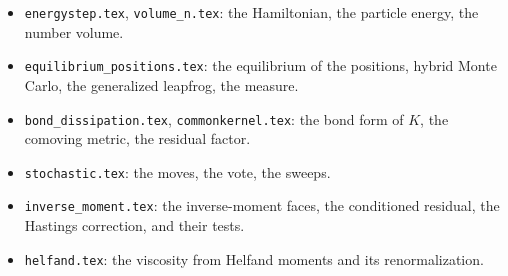 \documentclass[11pt,aps,preprint,nofootinbib,superscriptaddress,tightenlines]{revtex4-2}
\begin{document}
\begin{itemize}
\item \texttt{energystep.tex}, \texttt{volume\_n.tex}: the Hamiltonian, the particle energy, the number volume.
\item \texttt{equilibrium\_positions.tex}: the equilibrium of the positions, hybrid Monte Carlo, the generalized leapfrog, the measure.
\item \texttt{bond\_dissipation.tex}, \texttt{commonkernel.tex}: the bond form of $K$, the comoving metric, the residual factor.
\item \texttt{stochastic.tex}: the moves, the vote, the sweeps.
\item \texttt{inverse\_moment.tex}: the inverse-moment faces, the conditioned residual, the Hastings correction, and their tests.
\item \texttt{helfand.tex}: the viscosity from Helfand moments and its renormalization.
\end{itemize}
\end{document}
